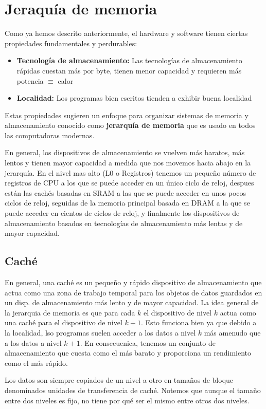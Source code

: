 \section{Jeraquía de memoria}
Como ya hemos descrito anteriormente, el hardware y software tienen ciertas propiedades fundamentales y perdurables:
\begin{itemize}
    \item \textbf{Tecnología de almacenamiento:} Las tecnologías de almacenamiento rápidas cuestan más por byte, tienen menor capacidad y requieren 
        más potencia $\equiv$ calor
    \item \textbf{Localidad:} Los programas bien escritos tienden a exhibir buena localidad
\end{itemize}
Estas propiedades sugieren un enfoque para organizar sistemas de memoria y almacenamiento conocido 
como \textbf{jerarquía de memoria} que es usado en todos las computadoras modernas.
\begin{center}
    
\end{center}
En general, los dispositivos de almacenamiento se vuelven más baratos, más lentos y tienen mayor capacidad a medida que nos movemos hacia abajo en la jerarquía.
En el nivel mas alto (L0 o Registros) tenemos un pequeño número de registros de CPU a los que se puede acceder en un único ciclo de reloj, despues están 
las cachés basadas en SRAM a las que se puede acceder en unos pocos ciclos de reloj, seguidas de la memoria principal basada en DRAM a la que se puede acceder en 
cientos de ciclos de reloj, y finalmente los dispositivos de almacenamiento basados en tecnologías de almacenamiento más lentas y de mayor capacidad.
\subsection{Caché}
En general, una caché es un pequeño y rápido dispositivo de almacenamiento que actua como una zona de trabajo temporal para los objetos de datos guardados en un disp. de almacenamiento más lento y de mayor capacidad.
La idea general de la jerarquia de memoria es que para cada $k$ el dispositivo de nivel $k$ actua como una caché para el dispositivo de nivel $k+1$. Esto funciona bien ya que debido a la localidad,
lso programas suelen acceder a los datos a nivel $k$ más amenudo que a los datos a nivel $k + 1$. En consecuenica, tenemos un conjunto de almacenamiento que cuesta como el más barato y 
proporciona un rendimiento como el más rápido.
\begin{center}
    
\end{center}
Los datos son siempre copiados de un nivel a otro en tamaños de bloque denominados unidades de transferencia de caché. Notemos que aunque el tamaño entre 
dos niveles es fijo, no tiene por qué ser el mismo entre otros dos niveles.
